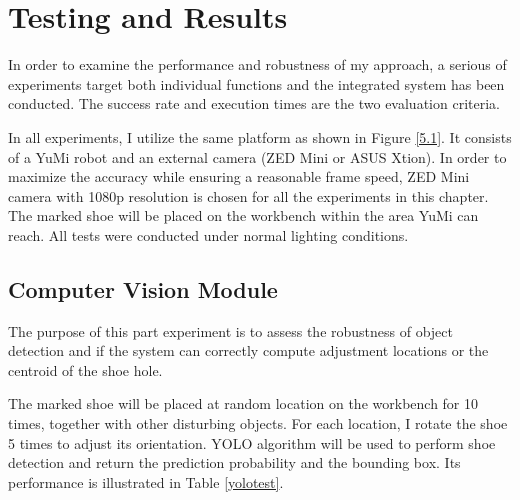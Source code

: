 \chapter{Testing and Results}

In order to examine the performance and robustness of my approach, a serious of experiments target both individual functions and the integrated system has been conducted. The success rate and execution times are the two evaluation criteria.

In all experiments, I utilize the same platform as shown in Figure \ref{5.1}. It consists of a YuMi robot and an external camera (ZED Mini or ASUS Xtion). In order to maximize the accuracy while ensuring a reasonable frame speed, ZED Mini camera with 1080p resolution is chosen for all the experiments in this chapter. The marked shoe will be placed on the workbench within the area YuMi can reach. All tests were conducted under normal lighting conditions. 

\section{Computer Vision Module}
The purpose of this part experiment is to assess the robustness of object detection and if the system can correctly compute adjustment locations or the centroid of the shoe hole.

The marked shoe will be placed at random location on the workbench for 10 times, together with other disturbing objects. For each location, I rotate the shoe 5 times to adjust its orientation. YOLO algorithm will be used to perform shoe detection and return the prediction probability and the bounding box. Its performance is illustrated in Table \ref{yolotest}.

